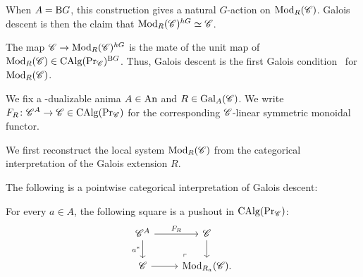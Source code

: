 \documentclass[english,svgnames,table]{article}
\begin{document}
    When $A = \mathrm{B} G$, this construction gives a natural $G$-action on $\operatorname{Mod}_R(\mathscr{C})$. Galois descent is then the claim that $\operatorname{Mod}_R(\mathscr{C})^{hG} \simeq \mathscr{C}$.
    \begin{remark}
        The map $\mathscr{C} \to \operatorname{Mod}_R(\mathscr{C})^{hG}$ is the mate of the unit map of $\operatorname{Mod}_R(\mathscr{C}) \in \operatorname{CAlg}(\operatorname{Pr}_{\mathscr{C}})^{\mathrm{B} G}$. Thus, Galois descent is the first Galois condition~ for $\operatorname{Mod}_R(\mathscr{C})$.
    \end{remark}
    We fix a \CO-dualizable anima $A \in \mathrm{An}$ and $R \in \mathrm{Gal}_A(\mathscr{C})$. We write $F_R \colon \mathscr{C}^A \to \mathscr{C} \in \operatorname{CAlg}(\operatorname{Pr}_{\mathscr{C}})$ for the corresponding $\mathscr{C}$-linear symmetric monoidal functor.
    
    We first reconstruct the local system $\operatorname{Mod}_R(\mathscr{C})$ from the categorical interpretation of the Galois extension $R$.

    The following is a pointwise categorical interpretation of Galois descent:
    \begin{proposition}
    \label{prop:categorical-descent-pointwise}
        For every $a \in A$, the following square is a pushout in $\operatorname{CAlg}(\operatorname{Pr}_{\mathscr{C}})$:
        \begin{equation*}
            \begin{tikzcd}
                {\cC^A} & {\cC} \\
                {\cC} & {\Mod_{R_a}(\cC).}
                \arrow["{F_R}", from=1-1, to=1-2]
                \arrow["{a^*}"', from=1-1, to=2-1]
                \arrow[from=1-2, to=2-2]
                \arrow[from=2-1, to=2-2]
                \arrow["\lrcorner"{anchor=center, pos=0.125, rotate=180}, draw=none, from=2-2, to=1-1]
            \end{tikzcd}
        \end{equation*}
    \end{proposition}
\end{document}
